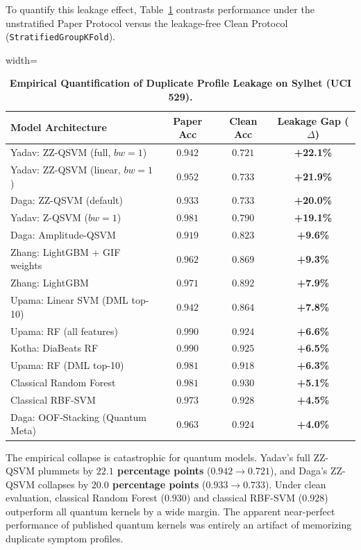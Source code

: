 \documentclass[journal,twocolumn]{IEEEtran}
\begin{document}
To quantify this leakage effect, Table~\ref{tab:leakage_inflation} contrasts performance under the unstratified Paper Protocol versus the leakage-free Clean Protocol (\texttt{StratifiedGroupKFold}).

\begin{table}[htbp]
\centering\footnotesize
\caption{\textbf{Empirical Quantification of Duplicate Profile Leakage on Sylhet (UCI 529).}}
\label{tab:leakage_inflation}
\begin{adjustbox}{width=\columnwidth}
\begin{tabular}{lccc}
\toprule
\textbf{Model Architecture} & \textbf{Paper Acc} & \textbf{Clean Acc} & \textbf{Leakage Gap ($\Delta$)} \\
\midrule
Yadav: ZZ-QSVM (full, $bw=1$) & $0.942$ & $0.721$ & \textbf{+22.1\%} \\
Yadav: ZZ-QSVM (linear, $bw=1$) & $0.952$ & $0.733$ & \textbf{+21.9\%} \\
Daga: ZZ-QSVM (default) & $0.933$ & $0.733$ & \textbf{+20.0\%} \\
Yadav: Z-QSVM ($bw=1$) & $0.981$ & $0.790$ & \textbf{+19.1\%} \\
Daga: Amplitude-QSVM & $0.919$ & $0.823$ & \textbf{+9.6\%} \\
Zhang: LightGBM + GIF weights & $0.962$ & $0.869$ & \textbf{+9.3\%} \\
Zhang: LightGBM & $0.971$ & $0.892$ & \textbf{+7.9\%} \\
Upama: Linear SVM (DML top-10) & $0.942$ & $0.864$ & \textbf{+7.8\%} \\
Upama: RF (all features) & $0.990$ & $0.924$ & \textbf{+6.6\%} \\
Kotha: DiaBeats RF & $0.990$ & $0.925$ & \textbf{+6.5\%} \\
Upama: RF (DML top-10) & $0.981$ & $0.918$ & \textbf{+6.3\%} \\
Classical Random Forest & $0.981$ & $0.930$ & \textbf{+5.1\%} \\
Classical RBF-SVM & $0.973$ & $0.928$ & \textbf{+4.5\%} \\
Daga: OOF-Stacking (Quantum Meta) & $0.963$ & $0.924$ & \textbf{+4.0\%} \\
\bottomrule
\end{tabular}
\end{adjustbox}
\end{table}

The empirical collapse is catastrophic for quantum models. Yadav's full ZZ-QSVM plummets by \textbf{$22.1$ percentage points} ($0.942 \to 0.721$), and Daga's ZZ-QSVM collapses by \textbf{$20.0$ percentage points} ($0.933 \to 0.733$). Under clean evaluation, classical Random Forest ($0.930$) and classical RBF-SVM ($0.928$) outperform all quantum kernels by a wide margin. The apparent near-perfect performance of published quantum kernels was entirely an artifact of memorizing duplicate symptom profiles.
\end{document}
